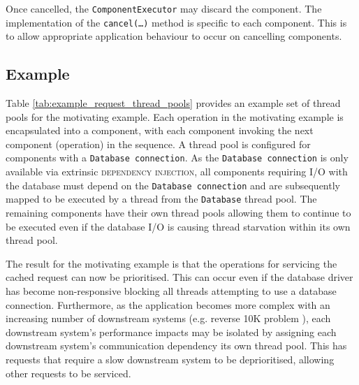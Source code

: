\documentclass[prodmode]{style/acmlarge}
\begin{document}
Once cancelled, the \texttt{ComponentExecutor} may discard the component.  The
implementation of the \texttt{can\-cel(\ldots)} method is specific to each
component.  This is to allow appropriate application behaviour to occur on
cancelling components.


\subsection{Example}

Table \ref{tab:example_request_thread_pools} provides an example set of thread
pools for the motivating example.  Each operation in the motivating example is
encapsulated into a component, with each component invoking the next component
(operation) in the sequence.  A thread pool is configured for components with a
\texttt{Database connection}.  As the \texttt{Database connection} is only
available via extrinsic \textsc{dependency injection}, all components requiring
I/O with the database must depend on the \texttt{Database connection} and are
subsequently mapped to be executed by a thread from the \texttt{Database} thread
pool.  The remaining components have their own thread pools allowing them to
continue to be executed even if the database I/O is causing thread starvation
within its own thread pool.

\begin{table}[t]
\label{tab:example_request_thread_pools}
\end{table}

The result for the motivating example is that the operations for servicing the
cached request can now be prioritised.  This can occur even if the database
driver has become non-responsive blocking all threads attempting to use a
database connection.  Furthermore, as the application becomes more complex with
an increasing number of downstream systems (e.g. reverse 10K problem
\cite{reverse-ten-k-problem}), each downstream system's performance impacts may
be isolated by assigning each downstream system's communication dependency its
own thread pool.  This has requests that require a slow downstream system to be
deprioritised, allowing other requests to be serviced.
\end{document}
